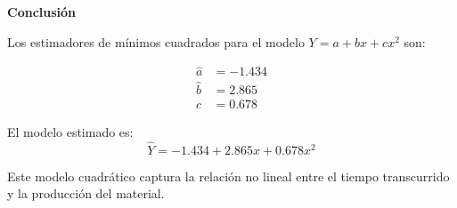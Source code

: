 \documentclass[11pt,a4paper]{article}
\begin{document}
\textbf{Conclusión}

Los estimadores de mínimos cuadrados para el modelo $Y = a + bx + cx^2$ son:

\[
\boxed{
\begin{aligned}
\hat{a} &= -1.434 \\
\hat{b} &= 2.865 \\
\hat{c} &= 0.678
\end{aligned}
}
\]

El modelo estimado es:
\[
\hat{Y} = -1.434 + 2.865x + 0.678x^2
\]

Este modelo cuadrático captura la relación no lineal entre el tiempo transcurrido y la producción del material.
\end{document}

